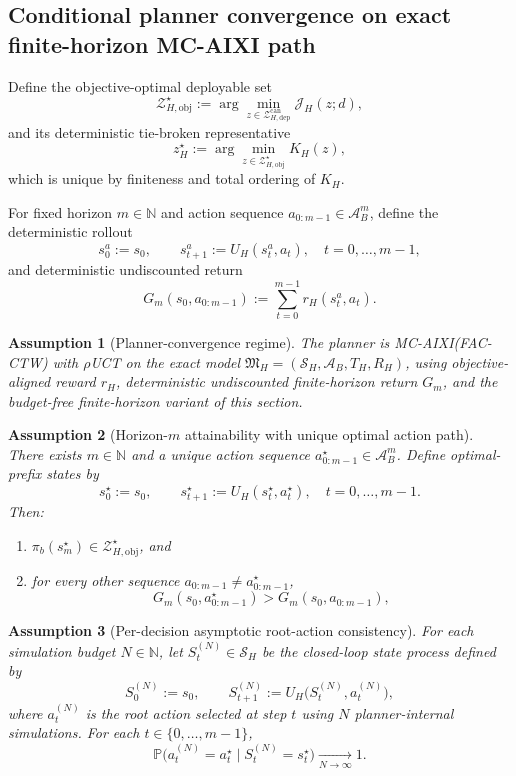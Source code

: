 \documentclass[11pt]{article}
\newtheorem{assumption}{Assumption}
\begin{document}
\subsection{Conditional planner convergence on exact finite-horizon MC-AIXI path}\label{sec:planner-convergence-mcaixi}

Define the objective-optimal deployable set
\[
\mathcal{Z}_{H,\mathrm{obj}}^{\star}:=
\arg\min_{z\in\mathcal{Z}_{H,\mathrm{dep}}^{\mathrm{can}}}\mathcal{J}_H(z;d),
\]
and its deterministic tie-broken representative
\[
z_H^{\star}:=\arg\min_{z\in\mathcal{Z}_{H,\mathrm{obj}}^{\star}}K_H(z),
\]
which is unique by finiteness and total ordering of $K_H$.

For fixed horizon $m\in\mathbb{N}$ and action sequence
$a_{0:m-1}\in\mathcal{A}_B^m$, define the deterministic rollout
\[
s_0^{a}:=s_0,
\qquad
s_{t+1}^{a}:=U_H(s_t^{a},a_t),
\quad t=0,\dots,m-1,
\]
and deterministic undiscounted return
\[
G_m(s_0,a_{0:m-1})
:=
\sum_{t=0}^{m-1} r_H(s_t^{a},a_t).
\]

\begin{assumption}[Planner-convergence regime]\label{ass:planner-conv-regime}
The planner is MC-AIXI(FAC-CTW) with $\rho$UCT on the exact model
$\mathfrak{M}_H=(\mathcal{S}_H,\mathcal{A}_B,T_H,R_H)$,
using objective-aligned reward $r_H$, deterministic undiscounted
finite-horizon return $G_m$,
and the budget-free finite-horizon variant of this section.
\end{assumption}

\begin{assumption}[Horizon-$m$ attainability with unique optimal action path]\label{ass:planner-conv-unique-path}
There exists $m\in\mathbb{N}$ and a unique action sequence
$a_{0:m-1}^{\star}\in\mathcal{A}_B^m$. Define optimal-prefix states by
\[
s_0^{\star}:=s_0,
\qquad
s_{t+1}^{\star}:=U_H(s_t^{\star},a_t^{\star}),
\quad t=0,\dots,m-1.
\]
Then:
\begin{enumerate}
    \item $\pi_b(s_m^{\star})\in\mathcal{Z}_{H,\mathrm{obj}}^{\star}$, and
    \item for every other sequence $a_{0:m-1}\neq a_{0:m-1}^{\star}$,
    \[
    G_m(s_0,a_{0:m-1}^{\star}) > G_m(s_0,a_{0:m-1}),
    \]
\end{enumerate}
\end{assumption}

\begin{assumption}[Per-decision asymptotic root-action consistency]\label{ass:planner-conv-root-consistency}
For each simulation budget $N\in\mathbb{N}$, let
$S_t^{(N)}\in\mathcal{S}_H$ be the closed-loop state process defined by
\[
S_0^{(N)}:=s_0,
\qquad
S_{t+1}^{(N)}:=U_H\big(S_t^{(N)},a_t^{(N)}\big),
\]
where $a_t^{(N)}$ is the root action selected at step $t$ using $N$
planner-internal simulations. For each $t\in\{0,\dots,m-1\}$,
\[
\mathbb{P}\!\big(a_t^{(N)}=a_t^{\star}\mid S_t^{(N)}=s_t^{\star}\big)
\xrightarrow[N\to\infty]{}1.
\]
\end{assumption}
\end{document}
